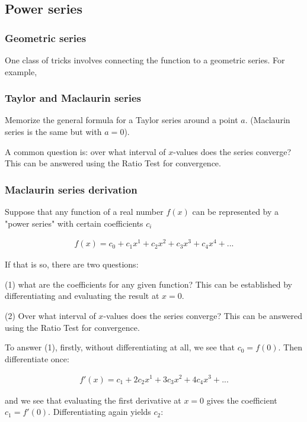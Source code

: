 \subsection{Power series}

\subsubsection{Geometric series}

One class of tricks involves connecting the function to a geometric series. For example,

\subsubsection{Taylor and Maclaurin series}

Memorize the general formula for a Taylor series around a point $a$. (Maclaurin series is the same but with $a=0$).

A common question is: over what interval of $x$-values does the series converge? This can be answered using the Ratio Test for convergence.

\subsubsection{Maclaurin series derivation}

Suppose that any function of a real number $f(x)$ can be represented by a "power series" with certain coefficients $c_i$

\begin{align*}
  f(x) = c_0 + c_1x^1 + c_2x^2 + c_3x^3 + c_4x^4 + ...
\end{align*}

If that is so, there are two questions:

(1) what are the coefficients for any given function? This can be established
by differentiating and evaluating the result at $x=0$.

(2) Over what interval of $x$-values does the series converge? This can be
answered using the Ratio Test for convergence.

To answer (1), firstly, without differentiating at all, we see that $c_0 = f(0)$. Then differentiate once:

\begin{align*}
  f'(x) = c_1 + 2c_2x^1 + 3c_3x^2 + 4c_4x^3 + ...
\end{align*}

and we see that evaluating the first derivative at $x=0$ gives the coefficient
$c_1 = f'(0)$. Differentiating again yields $c_2$:

